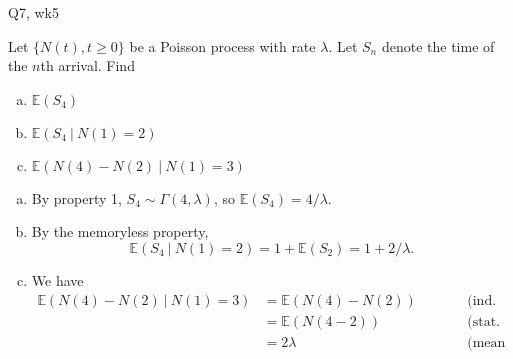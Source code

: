 \begin{problem}{Q7, wk5}{}


    Let $\{ N(t), t \geq 0 \}$ be a Poisson process with rate $\lambda$. Let $S_n$ denote the time of the $n$th arrival. Find
    \begin{enumerate}[a)]
        \item $\mathbb{E}(S_4)$
        \item $\mathbb{E}(S_4 \ \vert \ N(1) = 2)$
        \item $\mathbb{E}(N(4) - N(2) \ \vert \ N(1) = 3)$
    \end{enumerate}

    \tcblower

    \begin{enumerate}[a)]
        \item By property 1, $S_4 \sim \Gamma(4, \lambda)$, so $\mathbb{E}(S_4) = 4/\lambda$.
        \item By the memoryless property,
            $$ \mathbb{E}(S_4 \ \vert \ N(1) = 2) = 1 + \mathbb{E}(S_2) = 1 + 2/\lambda . $$
        \item We have
            \begin{align*}
                \mathbb{E}(N(4) - N(2) \ \vert \ N(1) = 3)
                    &= \mathbb{E}(N(4) - N(2)) \qquad &&\text{(ind. inc. prop.)} \\
                &= \mathbb{E}(N(4 - 2)) \qquad &&\text{(stat. inc. prop.)} \\
                &= 2 \lambda \qquad &&\text{(mean of Poiss. dist.)}
            \end{align*}
    \end{enumerate}

\end{problem}

